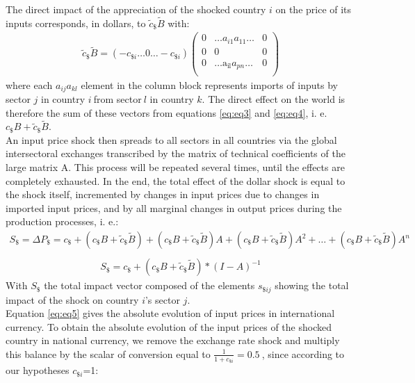 \documentclass[11pt,a4paper]{article}
\begin{document}
The direct impact of the appreciation of the shocked country $i$ on the price of its inputs corresponds, in dollars, to ${{\tilde{c}}_{\$}}{\tilde{B}}$ with: 
\begin{eqnarray}
{{\tilde{c}}_{\$}}{\tilde{B}}=\left(-{{{c}}_{\$i}}\ldots0\ldots-{{{c}}_{\$i}}\right)\left(\begin{matrix}0&\ldots{{{a}}_{{i}1}}{{{a}}_{11}}\ldots&0\\0&0&0\\0&\ldots{{\text{a}}_{\text{il}}}{{{a}}_{{pn}}}\ldots&0\\\end{matrix}\right) 
\label{eq:eq4}
 \end{eqnarray}
where each ${{{a}}_{{ij}}}{{{a}}_{{kl}}}$ element in the column block represents imports of inputs by sector $j$ in country $i~$from sector$~l$ in country $k$.
The direct effect on the world is therefore the sum of these vectors from equations  \ref{eq:eq3} and \ref{eq:eq4}, i. e. ${{c}_{\$}}{B}+{{\tilde{c}}_{\$}}{\tilde{B}}.~$\\
An input price shock then spreads to all sectors in all countries via the global intersectoral exchanges transcribed by the matrix of technical coefficients of the large matrix A. This process will be repeated several times, until the effects are completely exhausted.
In the end, the total effect of the dollar shock is equal to the shock itself, incremented by changes in input prices due to changes in imported input prices, and by all marginal changes in output prices during the production processes, i. e.:\\
\begin{eqnarray*}
	S_\$=\Delta{{P}_{\$}}=c_{\$}+(c_{\$}B+{{{\tilde{c}}}_{\$}}{\tilde{B}})+\left({{c}_{\$}}{B}+{{{\tilde{c}}}_{\$}}{\tilde{B}}\right){A}+\left({{c}_{\$}}{B}+{{{\tilde{c}}}_{\$}}{\tilde{B}}\right){{{A}}^{2}}+\ldots+\left({{c}_{\$}}{B}+{{{\tilde{c}}}_{\$}}{\tilde{B}}\right)A^n \\
 \end{eqnarray*}
 \begin{eqnarray}
{{S}_{\$}}={{c}_{\$}}+({{c}_{\$}}B+{{\tilde{c}}_{\$}}\tilde{B})*{{(I-A)}^{-1}}	
\label{eq:eq5}
 \end{eqnarray}
With ${{S}_{\$}}$ the total impact vector composed of the elements ${{{s}}_{\$ij}}$ showing the total impact of the shock on country $i$'s sector $j$. \\
Equation \ref{eq:eq5} gives the absolute evolution of input prices in international currency. To obtain the absolute evolution of the input prices of the shocked country in national currency, we remove the exchange rate shock and multiply this balance by the scalar of conversion equal to $\frac{1}{1+{{{c}}_{\$i}}}=0.5~$, since according to our hypotheses ${{{c}}_{\$i}}$=1:
\end{document}
